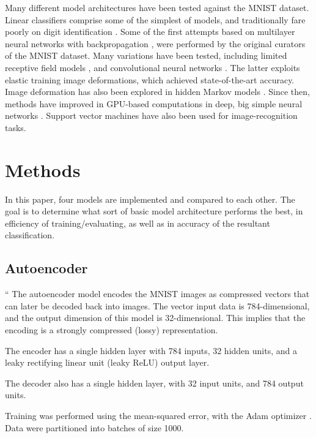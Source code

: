\documentclass{article}
\begin{document}
Many different model architectures have been tested against the MNIST dataset.
Linear classifiers comprise some of the simplest of models, and traditionally fare poorly on digit identification
\citep{bottouComparisonClassifierMethods1994}.
Some of the first attempts based on multilayer neural networks with backpropagation \citep{bottouComparisonClassifierMethods1994, lecunGradientbasedLearningApplied1998},
were performed by the original curators of the MNIST dataset.
Many variations have been tested, including limited receptive field models \citep{kussulImprovedMethodHandwritten2004},
and convolutional neural networks \citep{simardBestPracticesConvolutional2003}.
The latter exploits elastic training image deformations, which achieved state-of-the-art accuracy.
Image deformation has also been explored in hidden Markov models \citep{keysersDeformationModelsImage2007}.
Since then, methods have improved in GPU-based computations in deep, big simple neural networks
\citep{ciresanDeepBigSimple2010, ciresanMulticolumnDeepNeural2012}.
Support vector machines \citep{decosteTrainingInvariantSupport2002} have also been used for image-recognition tasks.

\section{Methods}

In this paper, four models are implemented and compared to each other.
The goal is to determine what sort of basic model architecture performs the best,
in efficiency of training/evaluating, as well as in accuracy of the resultant classification.

\subsection{Autoencoder}
``
The autoencoder model encodes the MNIST images as compressed vectors
that can later be decoded back into images.
The vector input data is 784-dimensional, and the output dimension of this model is 32-dimensional.
This implies that the encoding is a strongly compressed (lossy) representation.

The encoder has a single hidden layer with 784 inputs, 32 hidden units, and a leaky
rectifying linear unit (leaky ReLU) output layer.

The decoder also has a single hidden layer, with 32 input units, and 784 output units.

Training was performed using the mean-squared error, with the Adam optimizer \citep{kingmaAdamMethodStochastic2017}.
Data were partitioned into batches of size 1000.
\end{document}
